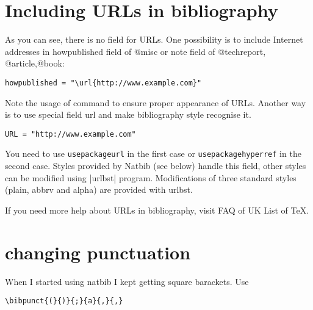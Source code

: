 \section{Including URLs in bibliography}

As you can see, there is no field for URLs. One possibility is to include Internet addresses in howpublished field of @misc or note field of @techreport, @article,@book:

\begin{lstlisting}[language={[common]TeX},% 
                           alsolanguage={[LaTeX]TeX},% 
                           alsolanguage={[primitive]TeX},%
                           alsolanguage={Verse}]
howpublished = "\url{http://www.example.com}"
\end{lstlisting}

Note the usage of  command to ensure proper appearance of URLs.
Another way is to use special field url and make bibliography style recognise it.

\begin{lstlisting}[language={[common]TeX},% 
                           alsolanguage={[LaTeX]TeX},% 
                           alsolanguage={[primitive]TeX},%
                           alsolanguage={Verse}]
URL = "http://www.example.com"
\end{lstlisting}

You need to use \texttt{usepackage{url}} in the first case or \texttt{usepackage{hyperref}} in the second case.
Styles provided by Natbib (see below) handle this field, other styles can be modified using |urlbst| program. Modifications of three standard styles (plain, abbrv and alpha) are provided with urlbst.

If you need more help about URLs in bibliography, visit FAQ of UK List of TeX.


\section{changing punctuation}

When I started using natbib I kept getting square barackets. Use
\begin{lstlisting}[language={[common]TeX},% 
                           alsolanguage={[LaTeX]TeX},% 
                           alsolanguage={[primitive]TeX},%
                           alsolanguage={Verse}]
    \bibpunct{(}{)}{;}{a}{,}{,}
    
\end{lstlisting}

